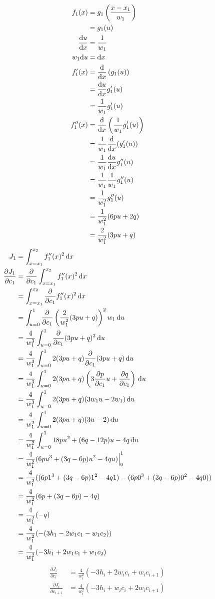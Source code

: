 \documentclass{article}
\begin{document}
\begin{align*}
  f_1(x)
  &= g_1\left(\frac{x-x_1}{w_1}\right) \\
  &= g_1(u) \\
  \frac{\mathrm{d}u}{\mathrm{d}x}
  &= \frac{1}{w_1} \\
  w_1\mathrm{d}u
  &= \mathrm{d}x \\
  f_1'(x)
  &= \frac{\mathrm{d}}{\mathrm{d}x} \left(g_1(u)\right) \\
  &= \frac{\mathrm{d}u}{\mathrm{d}x} g_1'(u) \\
  &= \frac{1}{w_1}g_1'(u) \\
  f_1''(x)
  &= \frac{\mathrm{d}}{\mathrm{d}x} \left(\frac{1}{w_1}g_1'(u)\right) \\
  &= \frac{1}{w_1} \frac{\mathrm{d}}{\mathrm{d}x} (g_1'(u)) \\
  &= \frac{1}{w_1} \frac{\mathrm{d}u}{\mathrm{d}x} g_1''(u) \\
  &= \frac{1}{w_1} \frac{1}{w_1} g_1''(u) \\
  &= \frac{1}{w_1^2} g_1''(u) \\
  &= \frac{1}{w_1^2}(6pu+2q) \\
  &= \frac{2}{w_1^2}(3pu+q)
\end{align*}
\begin{align*}
  J_1
  &= \int_{x=x_1}^{x_2}f_1''(x)^2\, \mathrm{d}x \\
  \frac{\partial J_1}{\partial c_1}
  &= \frac{\partial}{\partial c_1} \int_{x=x_1}^{x_2} f_1''(x)^2 \, \mathrm{d}x \\
  &= \int_{x=x_1}^{x_2} \frac{\partial}{\partial c_1} f_1''(x)^2 \, \mathrm{d}x \\
  &= \int_{u=0}^{1} \frac{\partial}{\partial c_1} \left(\frac{2}{w_1^2}(3pu+q)\right)^2 w_1 \, \mathrm{d}u \\
  &= \frac{4}{w_1^3} \int_{u=0}^{1} \frac{\partial}{\partial c_1} (3pu+q)^2 \, \mathrm{d}u \\
  &= \frac{4}{w_1^3} \int_{u=0}^{1} 2(3pu+q) \frac{\partial}{\partial c_1} (3pu+q) \, \mathrm{d}u \\
  &= \frac{4}{w_1^3} \int_{u=0}^{1} 2(3pu+q) \left(3\frac{\partial p}{\partial c_1}u+\frac{\partial q}{\partial c_1}\right) \, \mathrm{d}u \\
  &= \frac{4}{w_1^3} \int_{u=0}^{1} 2(3pu+q)(3w_1u-2w_1) \, \mathrm{d}u \\
  &= \frac{4}{w_1^2} \int_{u=0}^{1} 2(3pu+q)(3u-2) \, \mathrm{d}u \\
  &= \frac{4}{w_1^2} \int_{u=0}^{1} 18pu^2+(6q-12p)u-4q \, \mathrm{d}u \\
  &= \frac{4}{w_1^2} (6pu^3+(3q-6p)u^2-4qu)\Bigr|_0^1 \\
  &= \frac{4}{w_1^2} ((6p1^3+(3q-6p)1^2-4q1)-(6p0^3+(3q-6p)0^2-4q0)) \\
  &= \frac{4}{w_1^2} (6p+(3q-6p)-4q) \\
  &= \frac{4}{w_1^2} (-q) \\
  &= \frac{4}{w_1^2} (-(3h_1-2w_1c_1-w_1c_2)) \\
  &= \frac{4}{w_1^2} (-3h_1+2w_1c_1+w_1c_2)
\end{align*}
\begin{align*}
  \frac{\partial J_i}{\partial c_i}
  &= \frac{4}{w_i^2} (-3h_i+2w_ic_i+w_ic_{i+1}) \\
  \frac{\partial J_i}{\partial c_{i+1}}
  &= \frac{4}{w_i^2} (-3h_i+w_ic_i+2w_ic_{i+1})
\end{align*}
\end{document}
